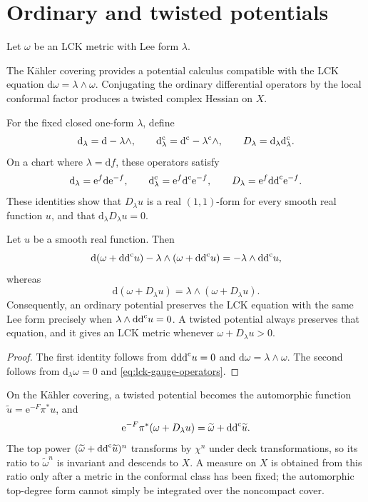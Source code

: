 

\section{Ordinary and twisted potentials}

Let $\omega$ be an LCK metric with Lee form $\lambda$.

The K\"ahler covering provides a potential calculus compatible with the LCK equation $\mathrm{d}\omega=\lambda\wedge\omega$. Conjugating the ordinary differential operators by the local conformal factor produces a twisted complex Hessian on $X$.

For the fixed closed one-form $\lambda$, define
\[
 \mathrm{d}_\lambda=\mathrm{d}-\lambda\wedge,
 \qquad \mathrm d^{\mathrm c}_\lambda=\mathrm d^{\mathrm c}-\lambda^{\mathrm c}\wedge,
 \qquad D_\lambda=\mathrm{d}_\lambda\mathrm d^{\mathrm c}_\lambda.
\]
On a chart where $\lambda=\mathrm{d}f$, these operators satisfy
\begin{equation}\label{eq:lck-gauge-operators}
 \mathrm{d}_\lambda=\mathrm{e}^f\mathrm{d}\mathrm{e}^{-f},
 \qquad \mathrm d^{\mathrm c}_\lambda=\mathrm{e}^f\mathrm d^{\mathrm c} \mathrm{e}^{-f},
 \qquad D_\lambda=\mathrm{e}^f\mathrm{dd}^{\mathrm{c}}\mathrm{e}^{-f}.
\end{equation}
These identities show that $D_\lambda u$ is a real $(1,1)$-form for every smooth real function $u$, and that $\mathrm{d}_\lambda D_\lambda u=0$.

\begin{proposition}\label{prop:lck-two-potentials}
Let $u$ be a smooth real function. Then
\[
 \mathrm{d}(\omega+\mathrm{dd}^{\mathrm{c}} u)-\lambda\wedge(\omega+\mathrm{dd}^{\mathrm{c}} u)
 =-\lambda\wedge\mathrm{dd}^{\mathrm{c}} u,
\]
whereas
\[
 \mathrm{d}(\omega+D_\lambda u)
 =\lambda\wedge(\omega+D_\lambda u).
\]
Consequently, an ordinary potential preserves the LCK equation with the same Lee form precisely when $\lambda\wedge\mathrm{dd}^{\mathrm{c}} u=0$. A twisted potential always preserves that equation, and it gives an LCK metric whenever $\omega+D_\lambda u>0$.
\end{proposition}
\begin{proof}
The first identity follows from $\mathrm{d}\mathrm{dd}^{\mathrm{c}} u=0$ and $\mathrm{d}\omega=\lambda\wedge\omega$. The second follows from $\mathrm{d}_\lambda\omega=0$ and \eqref{eq:lck-gauge-operators}.
\end{proof}

On the K\"ahler covering, a twisted potential becomes the automorphic function $\widetilde u=\mathrm{e}^{-F}\pi^*u$, and
\begin{equation}\label{eq:lck-lift-potential}
 \mathrm{e}^{-F}\pi^*(\omega+D_\lambda u)
 =\widetilde\omega+\mathrm{dd}^{\mathrm{c}}\widetilde u.
\end{equation}
The top power $(\widetilde\omega+\mathrm{dd}^{\mathrm{c}}\widetilde u)^n$ transforms by $\chi^n$ under deck transformations, so its ratio to $\widetilde\omega^n$ is invariant and descends to $X$. A measure on $X$ is obtained from this ratio only after a metric in the conformal class has been fixed; the automorphic top-degree form cannot simply be integrated over the noncompact cover.

